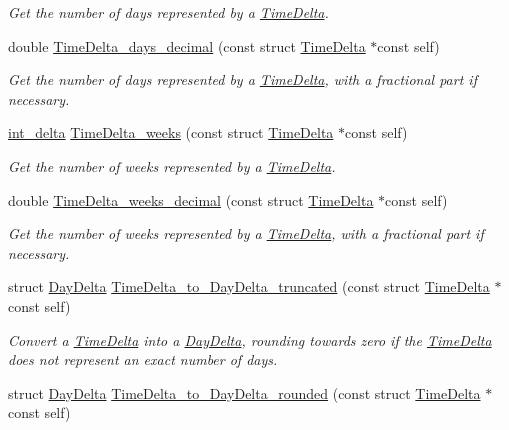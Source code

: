 \begin{DoxyCompactItemize}
\begin{DoxyCompactList}\small\item\em Get the number of days represented by a \hyperlink{structTimeDelta}{Time\-Delta}. \end{DoxyCompactList}\item 
double \hyperlink{time-delta_8h_a5b79dc42f8fca1ea501e016a24440464}{Time\-Delta\-\_\-days\-\_\-decimal} (const struct \hyperlink{structTimeDelta}{Time\-Delta} $\ast$const self)
\begin{DoxyCompactList}\small\item\em Get the number of days represented by a \hyperlink{structTimeDelta}{Time\-Delta}, with a fractional part if necessary. \end{DoxyCompactList}\item 
\hyperlink{types_8h_a8a67cf99971c5cfeeaa2380ba84a4c92}{int\-\_\-delta} \hyperlink{time-delta_8h_a162a7cec10d82c6cf922a32eb22f58d1}{Time\-Delta\-\_\-weeks} (const struct \hyperlink{structTimeDelta}{Time\-Delta} $\ast$const self)
\begin{DoxyCompactList}\small\item\em Get the number of weeks represented by a \hyperlink{structTimeDelta}{Time\-Delta}. \end{DoxyCompactList}\item 
double \hyperlink{time-delta_8h_a1cf0e7d811b1fd0dd4c50c26d110f30a}{Time\-Delta\-\_\-weeks\-\_\-decimal} (const struct \hyperlink{structTimeDelta}{Time\-Delta} $\ast$const self)
\begin{DoxyCompactList}\small\item\em Get the number of weeks represented by a \hyperlink{structTimeDelta}{Time\-Delta}, with a fractional part if necessary. \end{DoxyCompactList}\item 
struct \hyperlink{structDayDelta}{Day\-Delta} \hyperlink{time-delta_8h_abd089246702cb29504de0fe4e3057ad2}{Time\-Delta\-\_\-to\-\_\-\-Day\-Delta\-\_\-truncated} (const struct \hyperlink{structTimeDelta}{Time\-Delta} $\ast$const self)
\begin{DoxyCompactList}\small\item\em Convert a \hyperlink{structTimeDelta}{Time\-Delta} into a \hyperlink{structDayDelta}{Day\-Delta}, rounding towards zero if the \hyperlink{structTimeDelta}{Time\-Delta} does not represent an exact number of days. \end{DoxyCompactList}\item 
struct \hyperlink{structDayDelta}{Day\-Delta} \hyperlink{time-delta_8h_a7bbf766c60002c0835d0a81dfdfa7918}{Time\-Delta\-\_\-to\-\_\-\-Day\-Delta\-\_\-rounded} (const struct \hyperlink{structTimeDelta}{Time\-Delta} $\ast$const self)

\end{DoxyCompactItemize}
